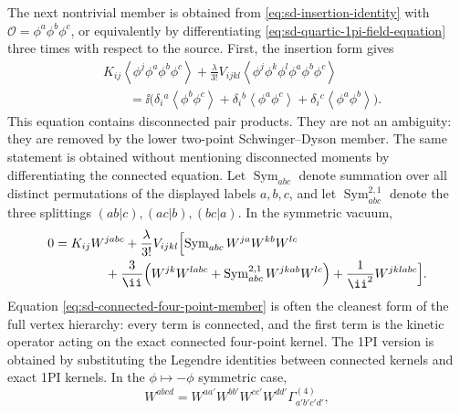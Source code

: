 The next nontrivial member is obtained from
\eqref{eq:sd-insertion-identity} with
\(\mathcal O=\phi^a\phi^b\phi^c\), or equivalently by differentiating
\eqref{eq:sd-quartic-1pi-field-equation} three times with respect to the
source.  First, the insertion form gives
\begin{equation}
\begin{aligned}
  &K_{ij}
    \left\langle\phi^j\phi^a\phi^b\phi^c\right\rangle
  +
  \frac{\lambda}{3!}V_{ijkl}
    \left\langle
      \phi^j\phi^k\phi^l\phi^a\phi^b\phi^c
    \right\rangle     \\
  &\qquad =
  \ii\bigl(
    \delta_i{}^a\left\langle\phi^b\phi^c\right\rangle
    +\delta_i{}^b\left\langle\phi^a\phi^c\right\rangle
    +\delta_i{}^c\left\langle\phi^a\phi^b\right\rangle
  \bigr).
\end{aligned}
  \label{eq:sd-full-four-point-member}
\end{equation}
This equation contains disconnected pair products.  They are not an ambiguity:
they are removed by the lower two-point Schwinger--Dyson member.  The same
statement is obtained without mentioning disconnected moments by differentiating
the connected equation.  Let
\(\operatorname{Sym}_{abc}\) denote summation over all distinct permutations
of the displayed labels \(a,b,c\), and let
\(\operatorname{Sym}^{2,1}_{abc}\) denote the three splittings
\((ab|c),(ac|b),(bc|a)\).  In the symmetric vacuum,
\begin{equation}
\begin{aligned}
  0
  &=
  K_{ij}W^{jabc}
  +
  \frac{\lambda}{3!}V_{ijkl}
  \Bigl[
    \operatorname{Sym}_{abc}
      W^{ja}W^{kb}W^{lc}                                      \\
  &\qquad\qquad
    +\frac{3}{\ii}
      \Bigl(
        W^{jk}W^{labc}
        +
        \operatorname{Sym}^{2,1}_{abc}
        W^{jkab}W^{lc}
      \Bigr)
    +\frac1{\ii^2}W^{jklabc}
  \Bigr] .
\end{aligned}
  \label{eq:sd-connected-four-point-member}
\end{equation}
Equation \eqref{eq:sd-connected-four-point-member} is often the cleanest form
of the full vertex hierarchy: every term is connected, and the first term is
the kinetic operator acting on the exact connected four-point kernel.  The
1PI version is obtained by substituting the Legendre identities between
connected kernels and exact 1PI kernels.  In the
\(\phi\mapsto-\phi\) symmetric case,
\begin{equation}
  W^{abcd}
  =
  W^{aa'}W^{bb'}W^{cc'}W^{dd'}
  \Gamma^{(4)}_{a'b'c'd'} ,
  \label{eq:sd-four-point-amputation-z2}
\end{equation}
